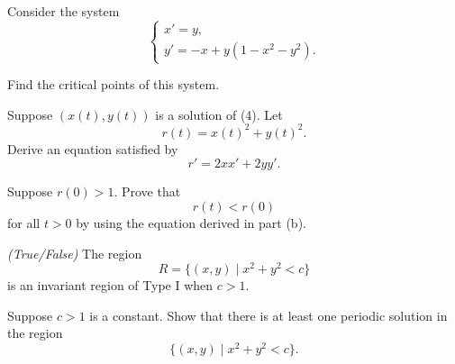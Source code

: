 \documentclass[11pt,oneside]{article}
\begin{document}
\begin{problem}
Consider the system
\[
\begin{cases}
x'=y,\\
y'=-x+y(1-x^2-y^2).
\end{cases} \tag{4}
\]
\begin{problemsubparts}
\item Find the critical points of this system.
\item Suppose $(x(t),y(t))$ is a solution of (4). Let
\[
r(t)=x(t)^2+y(t)^2.
\]
Derive an equation satisfied by
\[
r'=2xx'+2yy'.
\]
\item Suppose $r(0)>1$. Prove that
\[
r(t)<r(0)
\]
for all $t>0$ by using the equation derived in part (b).
\item \textit{(True/False)} The region
\[
R=\{(x,y)\mid x^2+y^2<c\}
\]
is an invariant region of Type I when $c>1$.
\item Suppose $c>1$ is a constant. Show that there is at least one periodic solution in the region
\[
\{(x,y)\mid x^2+y^2<c\}.
\]
\end{problemsubparts}
\end{problem}
\end{document}
